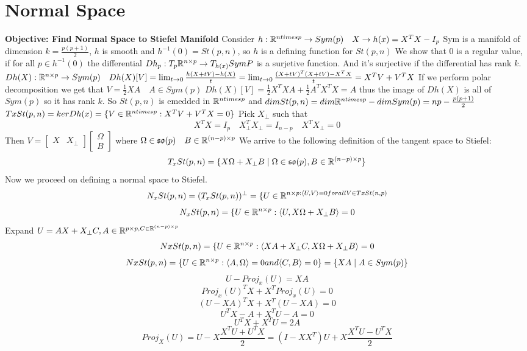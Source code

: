 \documentclass[11pt,a4paper]{report}
\begin{document}
\section{Normal Space}
\textbf{Objective: Find Normal Space to Stiefel Manifold} 
Consider $h: \mathbb{R}^{n times p} \to Sym(p) \quad X \to h(x) = X^T X - I_p$
Sym is a manifold of dimension $k = \frac{p (p+1)}{2}$, $h$ is smooth and $h^{-1}(0) = St(p,n)$, so $h$ is a defining function for $St(p,n)$
We show that $0$ is a regular value, if for all $p \in h^{-1}(0)$ the differential $D h_p: T_p \mathbb{R}^{n \times p} \to T_{h(x)} Sym P$
is a surjetive function. And it's surjective if the differential has rank $k$.
$Dh(X): \mathbb{R}^{n \times p} \to Sym(p) \quad Dh(X)[V] =  \lim_{t \to 0} \frac{h (X + tV) - h(X)}{t} =
\lim_{t \to 0} \frac{(X + tV)^T (X+tV) - X^T X}{t} = X^TV + V^T X $
If we perform polar decomposition we get that $V= \frac{1}{2} XA \quad A \in Sym(p)$
\newline
$Dh(X)[V] = \frac{1}{2} X^T X A + \frac{1}{2} A^T X^T X = A$ thus the image of $Dh(X)$ is all of $Sym(p)$ so it has rank $k$.
So $St(p,n)$ is emedded in $\mathbb{R}^{n times p}$ and $dim St(p,n) = dim \mathbb{R}^{n times p} - dim Sym(p) = np - \frac{p (p+1)}{2}$
$TxSt(p,n) = ker Dh(x) = \{ V \in \mathbb{R}^{n times p} : X^T V + V^T X = 0 \} $
Pick $X_{\perp}$ such that
$$ X^T X = I_p \quad X_{\perp}^T X_{\perp} = I_{n-p} \quad X^T X_{\perp} = 0 $$ 
Then $V = \begin{bmatrix} X & X_{\perp} \end{bmatrix} \begin{bmatrix} \Omega \\ B \end{bmatrix}$ where $\Omega \in \mathfrak{so}(p) \quad B \in \mathbb{R}^{ (n-p) \times p} $
We arrive to the following definition of the tangent space to Stiefel:
$$ T_x St(p,n) = \{ X \Omega + X_{\perp} B \; | \; \Omega \in \mathfrak{so}(p), B \in \mathbb{R}^{ (n-p) \times p} \} $$
Now we proceed on defining a normal space to Stiefel.
$$ N_x St(p,n) = (T_x St(p,n))^{\perp} = \{ U \in \mathbb{R}^{n \times p: \langle U, V \rangle = 0 for all V \in TxSt(n,p) } $$ 
$$ N_x St(p,n) = \{ U \in \mathbb{R}^{n \times p} : \langle U, X\Omega + X_{\perp} B \rangle = 0$$
Expand $U = AX + X_{\perp} C, A \in \mathbb{R}^{p \times p, C \in \mathbb{R}^{ (n-p) \times p}}$
$$ NxSt(p,n) = \{ U \in \mathbb{R}^{n \times p} : \langle XA + X_{\perp} C, X \Omega + X_{\perp} B \rangle = 0$$
$$ NxSt(p,n) = \{ U \in \mathbb{R}^{n \times p} : \langle A, \Omega \rangle = 0 and \langle C, B \rangle = 0 \} = \{ XA \; | \; A\in Sym(p) \}$$
\newline
$$ U - Proj_{x} (U) = XA$$
$$ Proj_{x}(U)^T X + X^T Proj_{x} (U) = 0 $$
$$ (U - XA) ^T X + X^T (U- XA ) = 0$$
$$ U^T X - A + X^T U - A = 0$$
$$ U^T X + X^T U = 2A $$
$$ Proj_{X} (U) = U - X \frac{X^T U + U^T X}{2} = (I - XX^T)U + X \frac{X^T U - U^T X}{2} $$
\end{document}
